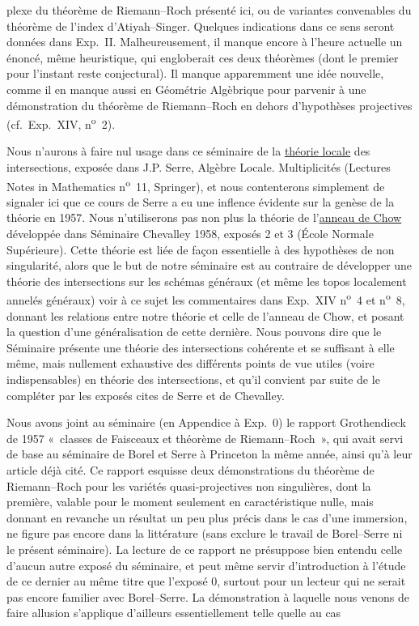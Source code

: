 plexe du théorème de Riemann--Roch présenté ici, ou de variantes convenables du théorème de l'index d'Atiyah--Singer. Quelques indications dans ce sens seront données dans Exp.\ II. Malheureusement, il manque encore à l'heure actuelle un énoncé, même heuristique, qui engloberait ces deux théorèmes (dont le premier pour l'instant reste conjectural). Il manque apparemment une idée nouvelle, comme il en manque aussi en Géométrie Algèbrique pour parvenir à une démonstration du théorème de Riemann--Roch en dehors d'hypothèses projectives (cf.\ Exp.\ XIV, n\textsuperscript{o}~2).

Nous n'aurons à faire nul usage dans ce séminaire de la \underline{théorie locale} des intersections, exposée dans J.P. Serre, Algèbre Locale. Multiplicités (Lectures Notes in Mathematics n\textsuperscript{o}~11, Springer), et nous contenterons simplement de signaler ici que ce cours de Serre a eu une inflence évidente sur la genèse de la théorie en 1957. Nous n'utiliserons pas non plus la théorie de l'\underline{anneau de Chow} développée dans Séminaire Chevalley 1958, exposés 2 et 3 (École Normale Supérieure). Cette théorie est liée de façon essentielle à des hypothèses de non singularité, alors que le but de notre séminaire est au contraire de développer une théorie des intersections sur les schémas généraux (et même les topos localement annelés généraux) voir à ce sujet les commentaires dans Exp.\ XIV n\textsuperscript{o}~4 et n\textsuperscript{o}~8, donnant les relations entre notre théorie et celle de l'anneau de Chow, et posant la question d'une généralisation de cette dernière. Nous pouvons dire que le Séminaire présente une théorie des intersections cohérente et se suffisant à elle même, mais nullement exhaustive des différents points de vue utiles (voire indispensables) en théorie des intersections, et qu'il convient par suite de le compléter par les exposés cites de Serre et de Chevalley.

Nous avons joint au séminaire (en Appendice à Exp.\ 0) le rapport Grothendieck de 1957 «~classes de Faisceaux et théorème de Riemann--Roch~», qui avait servi de base au séminaire de Borel et Serre à Princeton la même année, ainsi qu'à leur article déjà cité. Ce rapport esquisse deux démonstrations du théorème de Riemann--Roch pour les variétés quasi-projectives non singulières, dont la première, valable pour le moment seulement en caractéristique nulle, mais donnant en revanche un résultat un peu plus précis dans le cas d'une immersion, ne figure pas encore dans la littérature (sans exclure le travail de Borel--Serre ni le présent séminaire). La lecture de ce rapport ne présuppose bien entendu celle d'aucun autre exposé du séminaire, et peut même servir d'introduction à l'étude de ce dernier au même titre que l'exposé 0, surtout pour un lecteur qui ne serait pas encore familier avec Borel--Serre. La démonstration à laquelle nous venons de faire allusion s'applique d'ailleurs essentiellement telle quelle au cas 
